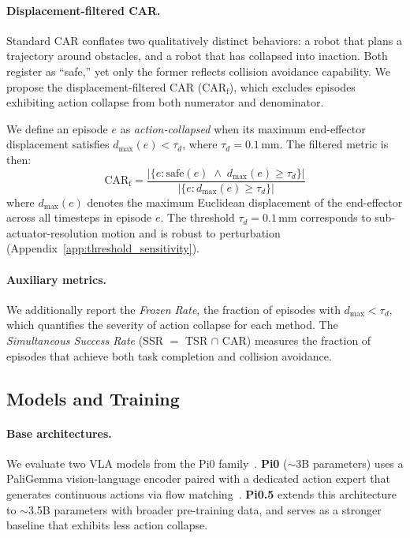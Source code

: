 \paragraph{Displacement-filtered CAR.} Standard CAR conflates two qualitatively distinct behaviors: a robot that plans a trajectory around obstacles, and a robot that has collapsed into inaction. Both register as ``safe,'' yet only the former reflects collision avoidance capability. We propose the displacement-filtered CAR (CAR$_\text{f}$), which excludes episodes exhibiting action collapse from both numerator and denominator.

We define an episode $e$ as \emph{action-collapsed} when its maximum end-effector displacement satisfies $d_{\max}(e) < \tau_d$, where $\tau_d = 0.1$\,mm. The filtered metric is then:
\begin{equation}\label{eq:car_f}
\text{CAR}_\text{f} = \frac{|\{e : \text{safe}(e) \;\land\; d_{\max}(e) \geq \tau_d\}|}{|\{e : d_{\max}(e) \geq \tau_d\}|}
\end{equation}
where $d_{\max}(e)$ denotes the maximum Euclidean displacement of the end-effector across all timesteps in episode $e$. The threshold $\tau_d = 0.1$\,mm corresponds to sub-actuator-resolution motion and is robust to perturbation (Appendix~\ref{app:threshold_sensitivity}).

\paragraph{Auxiliary metrics.} We additionally report the \emph{Frozen Rate}, the fraction of episodes with $d_{\max} < \tau_d$, which quantifies the severity of action collapse for each method. The \emph{Simultaneous Success Rate} (SSR $= $ TSR $\cap$ CAR) measures the fraction of episodes that achieve both task completion and collision avoidance.

\subsection{Models and Training}\label{sec:models}

\paragraph{Base architectures.} We evaluate two VLA models from the Pi0 family~\cite{black2024pi0}. \textbf{Pi0} (${\sim}$3B parameters) uses a PaliGemma vision-language encoder paired with a dedicated action expert that generates continuous actions via flow matching~\cite{lipman2023flow}. \textbf{Pi0.5} extends this architecture to ${\sim}$3.5B parameters with broader pre-training data, and serves as a stronger baseline that exhibits less action collapse.

